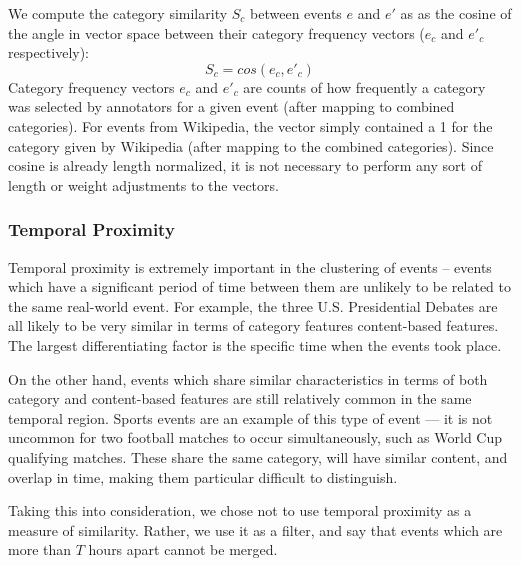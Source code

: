 We compute the category similarity $S_c$ between events $e$ and $e'$ as as the cosine of the angle in vector space between their category frequency vectors ($e_c$ and $e'_c$ respectively):
\begin{displaymath}
	S_c = cos(e_c, e'_c)
\end{displaymath}
Category frequency vectors $e_c$ and $e'_c$ are counts of how frequently a category was selected by annotators for a given event (after mapping to combined categories). For events from Wikipedia, the vector simply contained a 1 for the category given by Wikipedia (after mapping to the combined categories).
Since cosine is already length normalized, it is not necessary to perform any sort of length or weight adjustments to the vectors.

\subsubsection{Temporal Proximity}
Temporal proximity is extremely important in the clustering of events -- events which have a significant period of time between them are unlikely to be related to the same real-world event.
For example, the three U.S. Presidential Debates are all likely to be very similar in terms of category features content-based features.
The largest differentiating factor is the specific time when the events took place.

On the other hand, events which share similar characteristics in terms of both category and content-based features are still relatively common in the same temporal region.
Sports events are an example of this type of event --- it is not uncommon for two football matches to occur simultaneously, such as World Cup qualifying matches.
These share the same category, will have similar content, and overlap in time, making them particular difficult to distinguish.

Taking this into consideration, we chose not to use temporal proximity as a measure of similarity.
Rather, we use it as a filter, and say that events which are more than $T$ hours apart cannot be merged.


